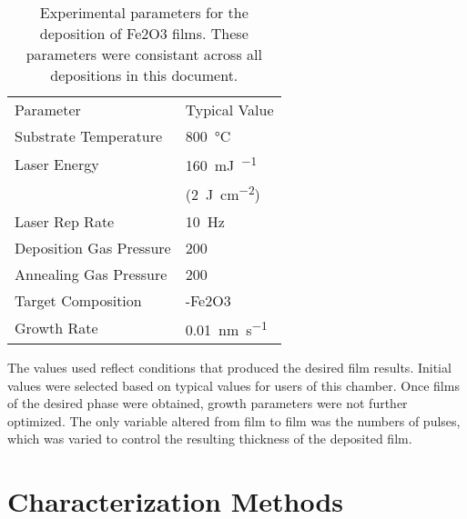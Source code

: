 \documentclass[12pt,%
              twoside,
               letterpaper]{uiothesis}
\begin{document}
\begin{table} \small
\begin{center}
	\begin{tabular}{ll}

		Parameter &  
		Typical Value   \\
		
		\cmidrule(lr){1-1}
		\cmidrule(lr){2-2}
		
   		Substrate Temperature & 
		800~\si{\degreeCelsius} \\
		
  		Laser Energy & 
		160~\si{\milli\joule\per\pulse}  \\
		
		&
		(2~\si{\joule\per\centi\meter\squared}) \\
		
		Laser Rep Rate & 
		10~\si{\hertz} \\
		
		Deposition Gas Pressure & 
		200~\si{\milli\torr} \\
		
		Annealing Gas Pressure & 
		200~\si{\torr} \\
		
		Target Composition & 
		\textalpha-Fe2O3 \\
		
		Growth Rate & 
		0.01~\si{\nano\meter\per\second} \\

	\end{tabular}
	\end{center}
  	\caption[Experimental parameters for Fe2O3 film deposition]{%
		Experimental parameters for the deposition of Fe2O3 films. 
		These parameters were consistant across all depositions in this 
		document.}
	\label{tab:pldparameters}
\end{table}

The values used reflect conditions that produced the desired film results. Initial values
were selected based on typical values for users of this  chamber. Once films of
the desired phase were obtained, growth parameters were not further optimized. The only
variable altered from film to film was the numbers of pulses, which was varied to control
the resulting thickness of the deposited film.


\section{Characterization Methods}
\label{sec:exp.characterization}
\end{document}

